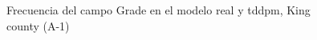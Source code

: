 \begin{figure}[H]
    \centering
    
    \caption{Frecuencia del campo Grade en el modelo real y tddpm, King county (A-1)}
    \label{frecuency-tddpm-grade}
\end{figure}